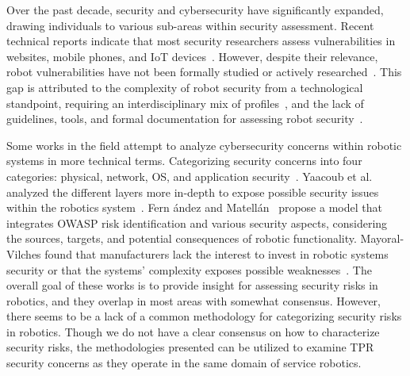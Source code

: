 Over the past decade, security and cybersecurity have significantly expanded, drawing individuals to various sub-areas within security
assessment. Recent technical reports indicate that most security researchers assess vulnerabilities in
websites, mobile phones, and \ac{IoT} devices~\cite[]{dbir_2022, robot_security_review_2022}.
However, despite their relevance, robot vulnerabilities have not been formally studied or actively researched~\cite[1]{robot_security_review_2022}. This gap is attributed to the complexity of robot security from a
technological standpoint, requiring an interdisciplinary mix of profiles~\cite[74-77]{introduction_to_robot_system_security_2021}, and the lack of guidelines, tools, and formal documentation
for assessing robot security~\cite[7]{cyber_security_issues_in_robotics_2021}.

Some works in the field attempt to analyze cybersecurity concerns within robotic
systems in more technical terms. Categorizing security concerns into four categories: physical, network, OS, and
application security~\cite[5]{robot_security_framework_2018}. Yaacoub et al. analyzed the different layers more in-depth to expose possible security issues within the robotics system~\cite[]{robotics_cyber_security_2022}. Fern
ández and
Matellán~\cite[
  76]{cyber_sec_robotics_privacy_safety_2017} propose a model that
integrates \ac{OWASP} risk identification and various  security aspects, considering the sources, targets, and potential
consequences of robotic functionality. Mayoral-Vilches found that manufacturers lack the interest to invest in robotic systems security
or that the systems' complexity exposes possible weaknesses~\cite[]{robot_security_review_2022}. The overall goal of these works is to
provide insight for assessing security risks in robotics, and they overlap in most areas with somewhat consensus. However, there seems to be a lack of a common methodology for categorizing security risks in robotics. Though we do not have a clear consensus on how to characterize security risks, the methodologies presented can be utilized to examine \ac{TPR} security concerns as they operate in the
same domain of service robotics.

